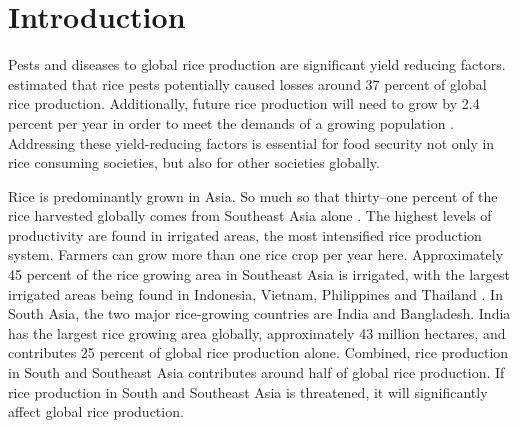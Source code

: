\section*{Introduction}

Pests and diseases to global rice production are significant yield reducing factors. \citet{OERKE:2006ct} estimated that rice pests potentially caused losses around 37 percent of global rice production. Additionally, future rice production will need to grow by 2.4 percent per year in order to meet the demands of a growing population \citep{Ray:2013by}. Addressing these yield-reducing factors is essential for food security not only in rice consuming societies, but also for other societies globally.


Rice is predominantly grown in Asia. So much so that thirty--one percent of the rice harvested globally comes from Southeast Asia alone \citep{oecd2012oecd}. The highest levels of productivity are found in irrigated areas, the most intensified rice production system. Farmers can grow more than one rice crop per year here. Approximately 45 percent of the rice growing area in Southeast Asia is irrigated, with the largest irrigated areas being found in Indonesia, Vietnam, Philippines and Thailand \citep{mutert2002developments}. In South Asia, the two major rice-growing countries are India and Bangladesh. India has the largest rice growing area globally, approximately 43 million hectares, and contributes 25 percent of global rice production alone. Combined, rice production in South and Southeast Asia contributes around half of global rice production. If rice production in South and Southeast Asia is threatened, it will significantly affect global rice production. 


